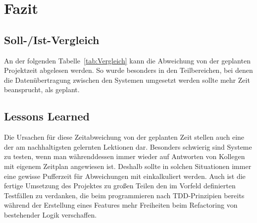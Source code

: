 \section{Fazit} 
\label{sec:Fazit}

\subsection{Soll-/Ist-Vergleich}
\label{sec:SollIstVergleich}

An der folgenden Tabelle~\ref{tab:Vergleich} kann die Abweichung von der geplanten Projektzeit abgelesen werden. So wurde besonders in den Teilbereichen, bei denen die Datenübertragung zwischen den Systemen umgesetzt werden sollte mehr Zeit beansprucht, als geplant.


\subsection{Lessons Learned}
\label{sec:LessonsLearned}

Die Ursachen für diese Zeitabweichung von der geplanten Zeit stellen auch eine der am nachhaltigsten gelernten Lektionen dar. Besonders schwierig sind Systeme zu testen, wenn man währenddessen immer wieder auf Antworten von Kollegen mit eigenem Zeitplan angewiesen ist. Deshalb sollte in solchen Situationen immer eine gewisse Pufferzeit für Abweichungen mit einkalkuliert werden. Auch ist die fertige Umsetzung des Projektes zu großen Teilen den im Vorfeld definierten Testfällen zu verdanken, die beim programmieren nach \ac{TDD}-Prinzipien bereits während der Erstellung eines Features mehr Freiheiten beim Refactoring von bestehender Logik verschaffen.

